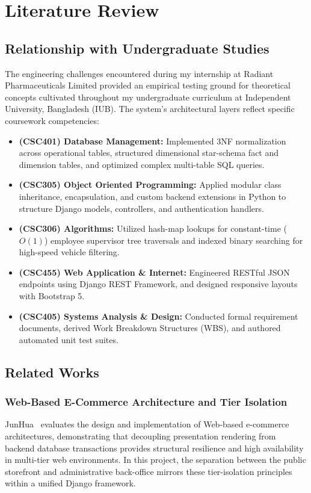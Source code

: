 \chapter{Literature Review}

\section{Relationship with Undergraduate Studies}

The engineering challenges encountered during my internship at Radiant Pharmaceuticals Limited provided an empirical testing ground for theoretical concepts cultivated throughout my undergraduate curriculum at Independent University, Bangladesh (IUB). The system's architectural layers reflect specific coursework competencies:

\begin{itemize}
    \item \textbf{(CSC401) Database Management:} Implemented 3NF normalization across operational tables, structured dimensional star-schema fact and dimension tables, and optimized complex multi-table SQL queries.
    \item \textbf{(CSC305) Object Oriented Programming:} Applied modular class inheritance, encapsulation, and custom backend extensions in Python to structure Django models, controllers, and authentication handlers.
    \item \textbf{(CSC306) Algorithms:} Utilized hash-map lookups for constant-time ($O(1)$) employee supervisor tree traversals and indexed binary searching for high-speed vehicle filtering.
    \item \textbf{(CSC455) Web Application \& Internet:} Engineered RESTful JSON endpoints using Django REST Framework, and designed responsive layouts with Bootstrap 5.
    
    \item \textbf{(CSC405) Systems Analysis \& Design:} Conducted formal requirement documents, derived Work Breakdown Structures (WBS), and authored automated unit test suites.
\end{itemize}

\section{Related Works}

\subsection{Web-Based E-Commerce Architecture and Tier Isolation}
JunHua~\cite{junhua2011design} evaluates the design and implementation of Web-based e-commerce architectures, demonstrating that decoupling presentation rendering from backend database transactions provides structural resilience and high availability in multi-tier web environments. In this project, the separation between the public storefront and administrative back-office mirrors these tier-isolation principles within a unified Django framework.

